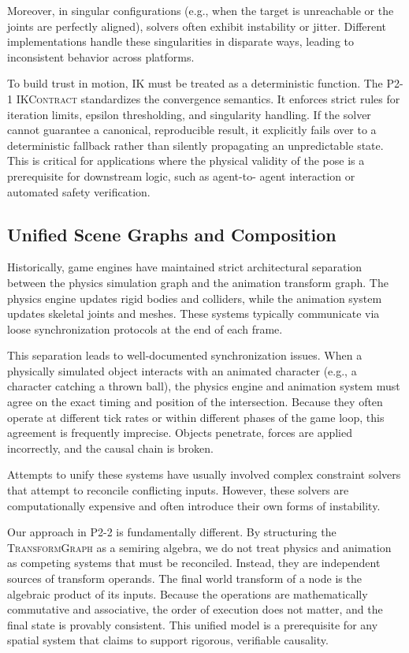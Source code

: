 \documentclass[sigconf,nonacm]{acmart}
\newcommand{\ikcontract}{\textsc{IKContract}}
\newcommand{\transformgraph}{\textsc{TransformGraph}}
\begin{document}
Moreover, in singular configurations (e.g., when the target is unreachable or
the joints are perfectly aligned), solvers often exhibit instability or jitter.
Different implementations handle these singularities in disparate ways, leading
to inconsistent behavior across platforms.

To build trust in motion, IK must be treated as a deterministic function. The
P2-1 \ikcontract{} standardizes the convergence semantics. It enforces strict
rules for iteration limits, epsilon thresholding, and singularity handling. If
the solver cannot guarantee a canonical, reproducible result, it explicitly
fails over to a deterministic fallback rather than silently propagating an
unpredictable state. This is critical for applications where the physical
validity of the pose is a prerequisite for downstream logic, such as agent-to-
agent interaction or automated safety verification.

\subsection{Unified Scene Graphs and Composition} Historically, game engines
have maintained strict architectural separation between the physics simulation
graph and the animation transform graph. The physics engine updates rigid bodies
and colliders, while the animation system updates skeletal joints and meshes.
These systems typically communicate via loose synchronization protocols at the
end of each frame.

This separation leads to well-documented synchronization issues. When a
physically simulated object interacts with an animated character (e.g., a
character catching a thrown ball), the physics engine and animation system must
agree on the exact timing and position of the intersection. Because they often
operate at different tick rates or within different phases of the game loop,
this agreement is frequently imprecise. Objects penetrate, forces are applied
incorrectly, and the causal chain is broken.

Attempts to unify these systems have usually involved complex constraint solvers
that attempt to reconcile conflicting inputs. However, these solvers are
computationally expensive and often introduce their own forms of instability.

Our approach in P2-2 is fundamentally different. By structuring the
\transformgraph{} as a semiring algebra, we do not treat physics and animation
as competing systems that must be reconciled. Instead, they are independent
sources of transform operands. The final world transform of a node is the
algebraic product of its inputs. Because the operations are mathematically
commutative and associative, the order of execution does not matter, and the
final state is provably consistent. This unified model is a prerequisite for any
spatial system that claims to support rigorous, verifiable causality.
\end{document}
